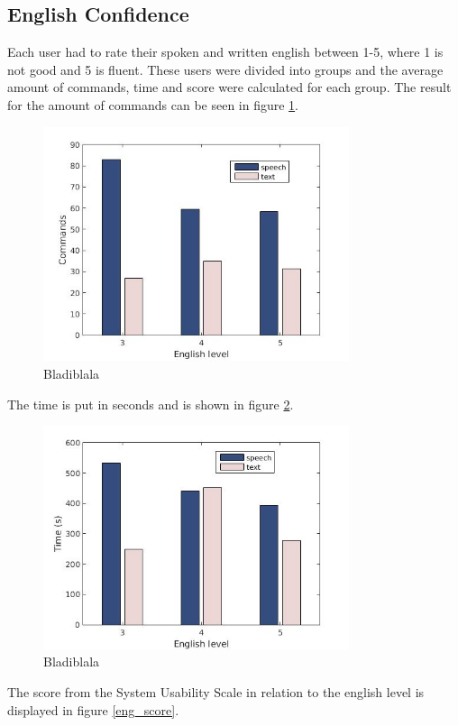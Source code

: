 \subsection{English Confidence}
Each user had to rate their spoken and written english between 1-5, where 1 is not good and 5 is fluent. These users were divided into groups and the average amount of commands, time and score were calculated for each group. The result for the amount of commands can be seen in figure \ref{eng_cmd}. 
\begin{figure}[p]
  \centering
  \includegraphics[width=0.8\textwidth]{images/english_cmd.jpg}
  \caption{Bladiblala}\label{eng_cmd}
\end{figure}
The time is put in seconds and is shown in figure \ref{eng_time}.
\begin{figure}[p]
  \centering
  \includegraphics[width=0.8\textwidth]{images/english_time.jpg}
  \caption{Bladiblala}\label{eng_time}
\end{figure}
The score from the System Usability Scale in relation to the english level is displayed in figure \ref{eng_score}.
